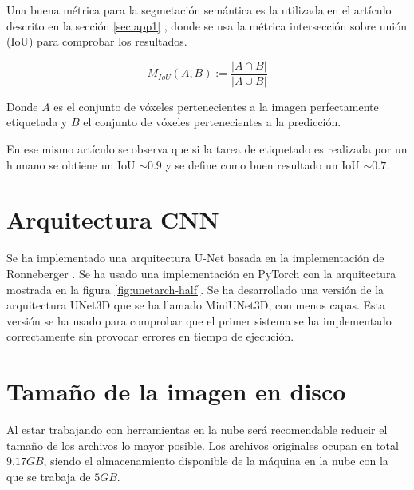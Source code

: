 Una buena métrica para la segmetación semántica es la utilizada en el artículo descrito en la sección \ref{sec:app1} \cite{Falk2019}, donde se usa la métrica intersección sobre unión (IoU) para comprobar los resultados.

\begin{equation}
M_{IoU}(A, B) := \frac{|A\cap B|}{|A\cup B|}
\end{equation}

Donde $A$ es el conjunto de vóxeles pertenecientes a la imagen perfectamente etiquetada y $B$ el conjunto de vóxeles pertenecientes a la predicción.

En ese mismo artículo se observa que si la tarea de etiquetado es realizada por un humano se obtiene un IoU $\sim0.9$ y se define como buen resultado un IoU $\sim0.7$.


\pagebreak \section{Arquitectura CNN}\label{sec:choose_cnn_arch}

Se ha implementado una arquitectura U-Net basada en la implementación de Ronneberger \cite{Ronneberger2015}. Se ha usado una implementación en PyTorch \cite{shiba242017} con la arquitectura mostrada en la figura \ref{fig:unetarch-half}. Se ha desarrollado una versión de la arquitectura UNet3D que se ha llamado MiniUNet3D, con menos capas. Esta versión se ha usado para comprobar que el primer sistema se ha implementado correctamente sin provocar errores en tiempo de ejecución.


\section{Tamaño de la imagen en disco}\label{sec:disk_problem}

Al estar trabajando con herramientas en la nube será recomendable reducir el tamaño de los archivos lo mayor posible. Los archivos originales ocupan en total $9.17GB$, siendo el almacenamiento disponible de la máquina en la nube con la que se trabaja de $5GB$.

